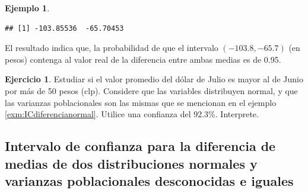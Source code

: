 \documentclass[
  11pt,
]{book}
\theoremstyle{definition}
\theoremstyle{definition}
\newtheorem{example}{Ejemplo}[chapter]
\theoremstyle{definition}
\newtheorem{exercise}{Ejercicio}[chapter]
\theoremstyle{definition}
\theoremstyle{remark}
\begin{document}
\begin{example}
\begin{verbatim}
## [1] -103.85536  -65.70453
\end{verbatim}

El resultado indica que, la probabilidad de que el intervalo \((-103.8,  -65.7)\) (en pesos) contenga al valor real de la diferencia entre ambas medias es de 0.95.
\end{example}

\begin{exercise}
Estudiar si el valor promedio del dólar de Julio es mayor al de Junio por más de 50 pesos (clp). Considere que las variables distribuyen normal, y que las varianzas poblacionales son las mismas que se mencionan en el ejemplo \ref{exm:ICdiferencianormal}. Utilice una confianza del 92.3\%. Interprete.
\end{exercise}

\subsection{Intervalo de confianza para la diferencia de medias de dos distribuciones normales y varianzas poblacionales desconocidas e iguales}\label{intervalo-de-confianza-para-la-diferencia-de-medias-de-dos-distribuciones-normales-y-varianzas-poblacionales-desconocidas-e-iguales}

\begin{table}[H]
\centering
\caption{\label{tab:unnamed-chunk-16}Intervalos de confianza para la diferencia de medias de dos distribucones normales y varianzas poblacionales desconocidas e iguales}
\centering
{}
\end{table}
\end{document}
